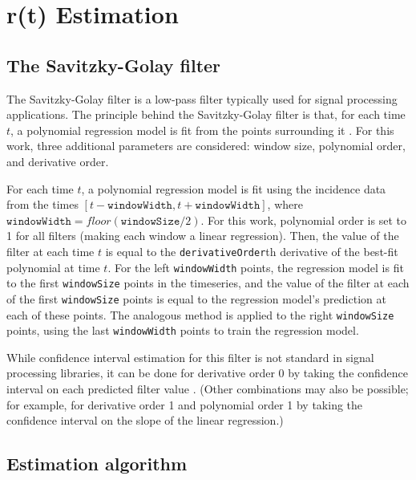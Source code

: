 \documentclass{article}
\newcommand{\code}[1]{\texttt{#1}}
\begin{document}
\section{r(t) Estimation}

\subsection{The Savitzky-Golay filter}
	The Savitzky-Golay filter is a low-pass filter typically used for signal processing applications. The principle behind the Savitzky-Golay filter is that, for each time $t$, a polynomial regression model is fit from the points surrounding it \cite{SG}. For this work, three additional parameters are considered: window size, polynomial order, and derivative order. 
	
	For each time $t$, a polynomial regression model is fit using the incidence data from the times $[t-\code{windowWidth}, t+\code{windowWidth}]$, where $\code{windowWidth} = floor(\code{windowSize}/2)$. For this work, polynomial order is set to 1 for all filters (making each window a linear regression). Then, the value of the filter at each time $t$ is equal to the \code{derivativeOrder}th derivative of the best-fit polynomial at time $t$. For the left \code{windowWidth} points, the regression model is fit to the first \code{windowSize} points in the timeseries, and the value of the filter at each of the first \code{windowSize} points is equal to the regression model's prediction at each of these points. The analogous method is applied to the right \code{windowSize} points, using the last \code{windowWidth} points to train the regression model. 

	While confidence interval estimation for this filter is not standard in signal processing libraries, it can be done for derivative order 0 by taking the confidence interval on each predicted filter value \cite{SciPySG}. (Other combinations may also be possible; for example, for derivative order 1 and polynomial order 1 by taking the confidence interval on the slope of the linear regression.)

\subsection{Estimation algorithm}
\end{document}
